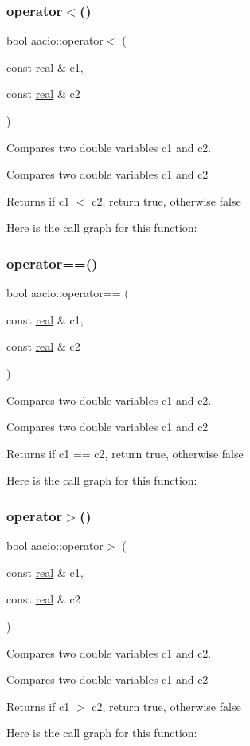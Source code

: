 \subsubsection{\texorpdfstring{operator$<$()}{operator<()}}
{\footnotesize\ttfamily bool aacio\+::operator$<$ (\begin{DoxyParamCaption}\item[{const \mbox{\hyperlink{classaacio_1_1real}{real}} \&}]{c1,  }\item[{const \mbox{\hyperlink{classaacio_1_1real}{real}} \&}]{c2 }\end{DoxyParamCaption})}



Compares two double variables c1 and c2. 

Compares two double variables c1 and c2 \begin{DoxyReturn}{Returns}
if c1 $<$ c2, return true, otherwise false 
\end{DoxyReturn}
Here is the call graph for this function\+:
\mbox{\label{group__real_ga37515f3f3a7c985eeb90435974576fbf}} 
\subsubsection{\texorpdfstring{operator==()}{operator==()}}
{\footnotesize\ttfamily bool aacio\+::operator== (\begin{DoxyParamCaption}\item[{const \mbox{\hyperlink{classaacio_1_1real}{real}} \&}]{c1,  }\item[{const \mbox{\hyperlink{classaacio_1_1real}{real}} \&}]{c2 }\end{DoxyParamCaption})}



Compares two double variables c1 and c2. 

Compares two double variables c1 and c2 \begin{DoxyReturn}{Returns}
if c1 == c2, return true, otherwise false 
\end{DoxyReturn}
Here is the call graph for this function\+:
\mbox{\label{group__real_gaead95e1ee7599f6710bf89c6490ab1a5}} 
\subsubsection{\texorpdfstring{operator$>$()}{operator>()}}
{\footnotesize\ttfamily bool aacio\+::operator$>$ (\begin{DoxyParamCaption}\item[{const \mbox{\hyperlink{classaacio_1_1real}{real}} \&}]{c1,  }\item[{const \mbox{\hyperlink{classaacio_1_1real}{real}} \&}]{c2 }\end{DoxyParamCaption})}



Compares two double variables c1 and c2. 

Compares two double variables c1 and c2 \begin{DoxyReturn}{Returns}
if c1 $>$ c2, return true, otherwise false 
\end{DoxyReturn}
Here is the call graph for this function\+:
